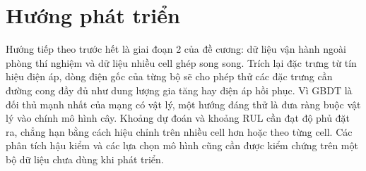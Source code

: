 \section{Hướng phát triển}

Hướng tiếp theo trước hết là giai đoạn 2 của đề cương: dữ liệu vận hành ngoài phòng thí nghiệm và dữ liệu nhiều cell
ghép song song. Trích lại đặc trưng từ tín hiệu điện áp, dòng điện gốc của từng bộ sẽ cho phép thử các đặc trưng cần
đường cong đầy đủ như dung lượng gia tăng hay điện áp hồi phục. Vì GBDT là đối thủ mạnh nhất của mạng có vật lý, một
hướng đáng thử là đưa ràng buộc vật lý vào chính mô hình cây. Khoảng dự đoán và khoảng RUL cần đạt độ phủ đặt ra, chẳng
hạn bằng cách hiệu chỉnh trên nhiều cell hơn hoặc theo từng cell. Các phân tích hậu kiểm và các lựa chọn mô hình cũng cần
được kiểm chứng trên một bộ dữ liệu chưa dùng khi phát triển.
